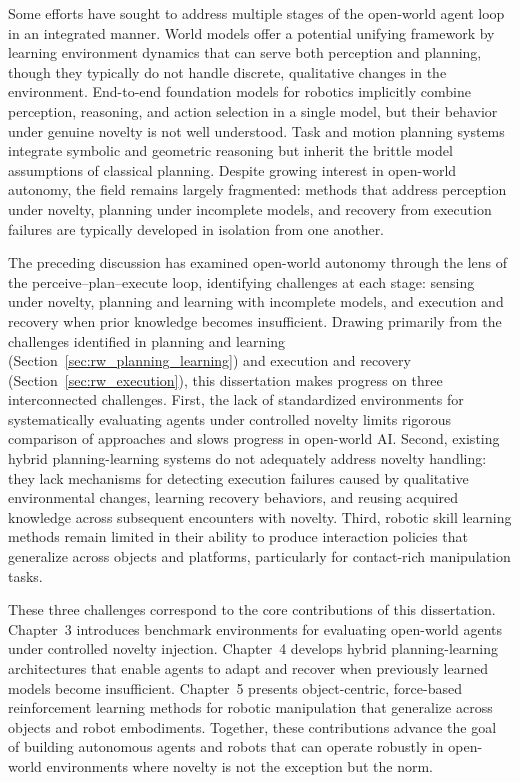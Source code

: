 Some efforts have sought to address multiple stages of the open-world agent loop in an integrated manner. World models \citep{ha2018world, hafner2023mastering} offer a potential unifying framework by learning environment dynamics that can serve both perception and planning, though they typically do not handle discrete, qualitative changes in the environment. End-to-end foundation models for robotics \citep{pmlr-v229-zitkovich23a, team2024octo} implicitly combine perception, reasoning, and action selection in a single model, but their behavior under genuine novelty is not well understood. Task and motion planning systems \citep{garrett2021integrated, kaelbling2011hierarchical} integrate symbolic and geometric reasoning but inherit the brittle model assumptions of classical planning. Despite growing interest in open-world autonomy, the field remains largely fragmented: methods that address perception under novelty, planning under incomplete models, and recovery from execution failures are typically developed in isolation from one another.

The preceding discussion has examined open-world autonomy 
through the lens of the perceive--plan--execute loop, 
identifying challenges at each stage: sensing under novelty, 
planning and learning with incomplete models, and execution 
and recovery when prior knowledge becomes insufficient. 
Drawing primarily from the challenges identified in planning 
and learning (Section~\ref{sec:rw_planning_learning}) and 
execution and recovery (Section~\ref{sec:rw_execution}), this 
dissertation makes progress on three interconnected challenges. 
First, the lack of standardized environments for systematically 
evaluating agents under controlled novelty limits rigorous 
comparison of approaches and slows progress in open-world AI. 
Second, existing hybrid planning-learning systems do not 
adequately address novelty handling: they lack mechanisms for 
detecting execution failures caused by qualitative environmental 
changes, learning recovery behaviors, and reusing acquired 
knowledge across subsequent encounters with novelty. Third, 
robotic skill learning methods remain limited in their ability 
to produce interaction policies that generalize across objects 
and platforms, particularly for contact-rich manipulation tasks.

These three challenges correspond to the core contributions of 
this dissertation. Chapter~3 introduces benchmark environments 
for evaluating open-world agents under controlled novelty 
injection. Chapter~4 develops hybrid planning-learning 
architectures that enable agents to adapt and recover when 
previously learned models become insufficient. Chapter~5 
presents object-centric, force-based reinforcement learning 
methods for robotic manipulation that generalize across objects 
and robot embodiments. Together, these contributions advance 
the goal of building autonomous agents and robots that can 
operate robustly in open-world environments where novelty is 
not the exception but the norm.